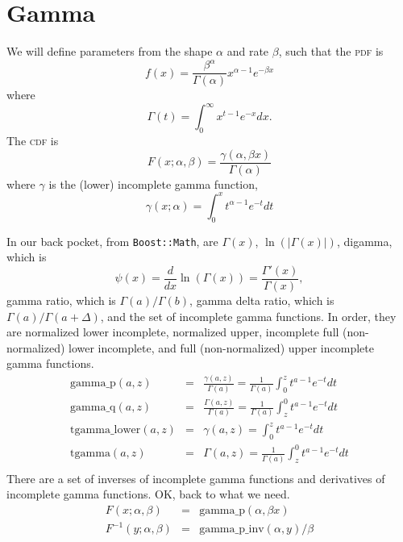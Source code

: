 \documentclass{article}
\begin{document}
\section{Gamma}
We will define parameters from the shape $\alpha$ and rate $\beta$,
such that the \textsc{pdf} is
\begin{equation}
  f(x)=\frac{\beta^\alpha}{\Gamma(\alpha)}x^{\alpha-1}e^{-\beta x}
\end{equation}
where
\begin{equation}
  \Gamma(t)=\int_0^\infty x^{t-1}e^{-x}dx.
\end{equation}
The \textsc{cdf} is
\begin{equation}
  F(x;\alpha,\beta)=\frac{\gamma(\alpha,\beta x)}{\Gamma(\alpha)}
\end{equation}
where $\gamma$ is the (lower) incomplete gamma function,
\begin{equation}
  \gamma(x;\alpha)=\int_0^x t^{\alpha-1}e^{-t}dt
\end{equation}

In our back pocket, from \texttt{Boost::Math}, are
$\Gamma(x)$, $\ln(|\Gamma(x)|)$, digamma, which is
\begin{equation}
  \psi(x)=\frac{d}{dx}\ln(\Gamma(x))=\frac{\Gamma'(x)}{\Gamma(x)},
\end{equation}
gamma ratio, which is $\Gamma(a)/\Gamma(b)$,
gamma delta ratio, which is $\Gamma(a)/\Gamma(a+\Delta)$,
and the set of incomplete gamma functions.
In order, they are normalized lower incomplete, normalized upper, incomplete
full (non-normalized) lower incomplete, and full (non-normalized)
upper incomplete gamma functions.
\begin{eqnarray}
  \mbox{gamma\_p}(a,z)&=&\frac{\gamma(a,z)}{\Gamma(a)}=\frac{1}{\Gamma(a)}
     \int_0^zt^{a-1}e^{-t}dt \\
  \mbox{gamma\_q}(a,z)&=&\frac{\Gamma(a,z)}{\Gamma(a)}=\frac{1}{\Gamma(a)}
     \int_z^0t^{a-1}e^{-t}dt \\
  \mbox{tgamma\_lower}(a,z)&=&\gamma(a,z)=
     \int_0^zt^{a-1}e^{-t}dt \\
  \mbox{tgamma}(a,z)&=&\Gamma(a,z)=\frac{1}{\Gamma(a)}
     \int_z^0t^{a-1}e^{-t}dt \\
\end{eqnarray}
There are a set of inverses of incomplete gamma functions
and derivatives of incomplete gamma functions.
OK, back to what we need.
\begin{eqnarray}
  F(x;\alpha,\beta)&=&\mbox{gamma\_p}(\alpha, \beta x) \\
  F^{-1}(y;\alpha,\beta)&=&\mbox{gamma\_p\_inv}(\alpha, y)/\beta
\end{eqnarray}
\end{document}
